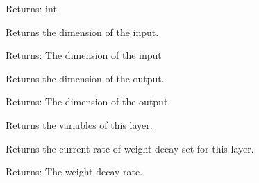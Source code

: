 \documentclass[letterpaper,10pt,english,openany,oneside]{sphinxmanual}
\begin{document}
\begin{fulllineitems}
\begin{fulllineitems}
Returns: int

\end{fulllineitems}


\begin{fulllineitems}
\label{\detokenize{_modules/layers:layers.FC.FC.get_input_dim}}
Returns the dimension of the input.

Returns: The dimension of the input

\end{fulllineitems}


\begin{fulllineitems}
\label{\detokenize{_modules/layers:layers.FC.FC.get_output_dim}}
Returns the dimension of the output.

Returns: The dimension of the output.

\end{fulllineitems}


\begin{fulllineitems}
\label{\detokenize{_modules/layers:layers.FC.FC.get_vars}}
Returns the variables of this layer.

\end{fulllineitems}


\begin{fulllineitems}
\label{\detokenize{_modules/layers:layers.FC.FC.get_weight_decay}}
Returns the current rate of weight decay set for this layer.

Returns: The weight decay rate.

\end{fulllineitems}



\end{fulllineitems}
\end{document}
